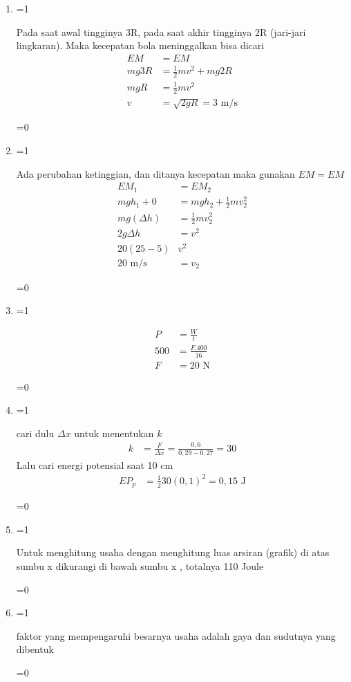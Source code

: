 \documentclass[10pt,a4paper]{article}
\def\tampilkunci{1}
\newcommand{\hide}[1]{\ifnum\tampilkunci=1
%
\begin{mybox}
 #1
\end{mybox}
%
\vspace{\baselineskip}\fi\ifnum\tampilkunci=0
%
%
\fi}
\begin{document}
\begin{multicols*}{2}
\begin{enumerate}
\item
\hide{
Pada saat awal tingginya 3R, pada saat akhir tingginya 2R (jari-jari lingkaran). Maka kecepatan bola meninggalkan bisa dicari
\begin{align*}
EM &= EM\\
mg3R &= \frac{1}{2}mv^2 + mg2R\\
mgR &= \frac{1}{2}mv^2\\
v&=\sqrt{2gR}= 3 \text{ m/s}
\end{align*}
}

\item 
\hide{
Ada perubahan ketinggian, dan ditanya kecepatan maka gunakan $EM = EM$
\begin{align*}
EM_1 &= EM_2\\
mgh_1 + 0 &= mgh_2 +\frac{1}{2}mv_2^2\\
mg(\Delta h) &= \frac{1}{2}mv_2^2\\
2g\Delta h &=v^2\\
20(25-5) &v^2\\
20 \text{ m/s}&= v_2
\end{align*}
}


\item 
\hide{
\begin{align*}
P &=\frac{W}{t}\\
500 &=\frac{F.400}{16}\\
F &= 20 \text{ N}
\end{align*} 
}

\item 
\hide{
cari dulu $\Delta x$ untuk menentukan $k$
\begin{align*}
k &=\frac{F}{\Delta x}=\frac{0,6}{0,29-0,27}=30
\end{align*}
Lalu cari energi potensial saat 10 cm
\begin{align*}
EP_p &= \frac{1}{2} 30 (0,1)^2=0,15\text{ J}
\end{align*}
}


\item 
\hide{
Untuk menghitung usaha dengan menghitung luas arsiran (grafik) di atas sumbu x dikurangi di bawah sumbu x , totalnya 110 Joule}

\item
\hide{
faktor yang mempengaruhi besarnya usaha adalah gaya dan sudutnya yang dibentuk}

\end{enumerate}
\end{multicols*} 
\end{document}
